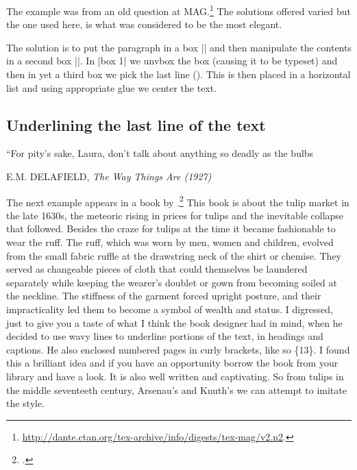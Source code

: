 The example was from an old question at \tex{}MAG.\footnote{\url{http://dante.ctan.org/tex-archive/info/digests/tex-mag/v2.n2}.} The solutions offered varied but the one used here, is what was considered to be the most elegant. 

\begin{teXXX}
\def\weirdtitle#1{%
       \bgroup
       \setbox0=\vbox{\bf\noindent #1}%
       \setbox1=\vbox{%
            \unvbox0
            \setbox2=\lastbox
            \hbox to \linewidth{\hfill\unhbox2 \hfill}%
       }%
       \unvbox1
      \egroup
  }%
\end{teXXX}

The solution is to put the paragraph in a box || and then manipulate the contents in a second box ||. In |box 1| we unvbox the box (causing it to be typeset) and then in yet a third box we pick the last line (\cmd{\lastbox}). This is then placed in a horizontal list and using appropriate glue we center the text. 

\subsection{Underlining the last line of the text}

\epigraph{“For pity’s sake, Laura,
don’t talk about anything so deadly as the bulbs}{\textsc{E.M. DELAFIELD}, \textit{The Way Things Are (1927)}}

The next example appears in a book by \citeauthor{tulipmania}.\footcite{tulipmania} This book is about the tulip market in the late 1630s, the meteoric rising in prices for tulips and the inevitable collapse that followed. Besides the craze for tulips at the time it became fashionable to wear the ruff. The ruff, which was worn by men, women and children, evolved from the small fabric ruffle at the drawstring neck of the shirt or chemise. They served as changeable pieces of cloth that could themselves be laundered separately while keeping the wearer's doublet or gown from becoming soiled at the neckline. The stiffness of the garment forced upright posture, and their impracticality led them to become a symbol of wealth and status. I digressed, just to give you a taste of what I think the book designer had in mind, when he decided to use wavy lines to underline portions of the text, in headings and captions. He also enclosed numbered pages in curly brackets, like so \{13\}. I found this a brilliant idea and if you have an opportunity borrow the book from your library and have a look. It is also well written and captivating. So from tulips in the middle seventeeth century, Arsenau's  and Knuth's \tex we can attempt to imitate the style.

